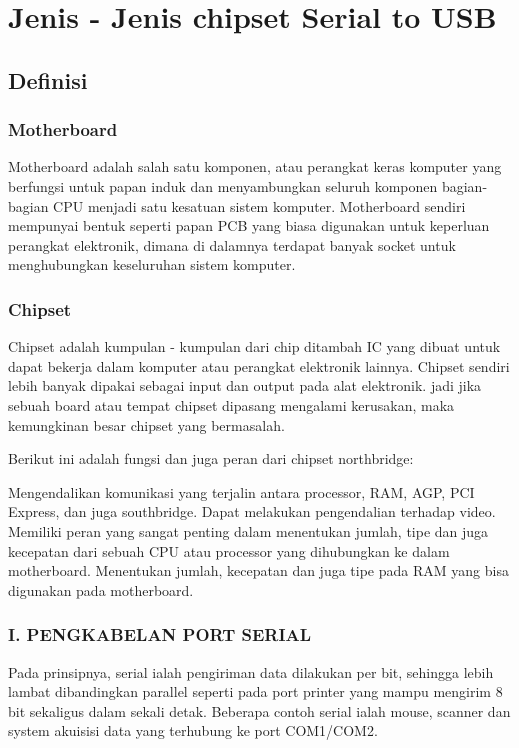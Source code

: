 \section{Jenis - Jenis chipset Serial to USB}
\subsection{Definisi}
\subsubsection{Motherboard}
Motherboard adalah salah satu komponen, atau perangkat keras komputer yang berfungsi  untuk papan induk dan menyambungkan seluruh komponen bagian-bagian CPU menjadi satu kesatuan sistem komputer. Motherboard sendiri  mempunyai  bentuk seperti  papan PCB yang biasa digunakan untuk keperluan perangkat elektronik, dimana di dalamnya terdapat banyak socket untuk menghubungkan keseluruhan sistem komputer.
\subsubsection{Chipset}
Chipset adalah kumpulan - kumpulan dari chip ditambah IC yang dibuat untuk dapat bekerja dalam komputer atau perangkat elektronik lainnya.
Chipset sendiri lebih banyak dipakai sebagai input dan output pada alat elektronik. jadi jika sebuah board atau tempat chipset dipasang mengalami kerusakan, maka kemungkinan besar chipset yang bermasalah.

Berikut ini adalah fungsi dan juga peran dari chipset northbridge:

Mengendalikan komunikasi yang terjalin antara processor, RAM, AGP, PCI Express, dan juga southbridge.
Dapat melakukan pengendalian terhadap video.
Memiliki peran yang sangat penting dalam menentukan jumlah, tipe dan juga kecepatan dari sebuah CPU atau processor yang dihubungkan ke dalam motherboard.
Menentukan jumlah, kecepatan dan juga tipe pada RAM yang bisa digunakan pada motherboard.

\subsubsection{I. PENGKABELAN PORT SERIAL}

Pada prinsipnya, serial ialah pengiriman data dilakukan per bit, sehingga lebih lambat dibandingkan parallel seperti pada port printer yang mampu mengirim 8 bit sekaligus dalam sekali detak. Beberapa contoh serial ialah mouse, scanner dan system akuisisi data yang terhubung ke port COM1/COM2.


